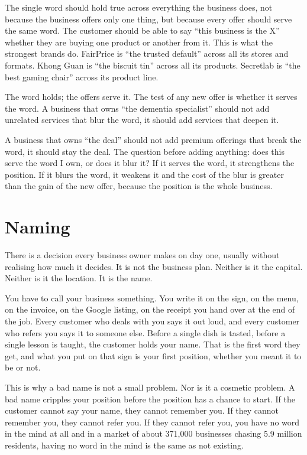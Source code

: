\documentclass[10pt,twoside,openany]{memoir}
\begin{document}
{The single word should hold true across everything the business does,
not because the business offers only one thing, but because every offer
should serve the same word. The customer should be able to say ``this
business is the X'' whether they are buying one product or another from
it. This is what the strongest brands do. FairPrice is ``the trusted
default'' across all its stores and formats. Khong Guan is ``the biscuit
tin'' across all its products. Secretlab is ``the best gaming chair''
across its product line.

The word holds; the offers serve it. The test of any new offer is
whether it serves the word. A business that owns ``the dementia
specialist'' should not add unrelated services that blur the word, it
should add services that deepen it.

A business that owns ``the deal'' should not add premium offerings that
break the word, it should stay the deal. The question before adding
anything: does this serve the word I own, or does it blur it? If it
serves the word, it strengthens the position. If it blurs the word, it
weakens it and the cost of the blur is greater than the gain of the new
offer, because the position is the whole business.

\FloatBarrier
\chapter{Naming}\label{naming}

There is a decision every business owner makes on day one, usually
without realising how much it decides. It is not the business plan.
Neither is it the capital. Neither is it the location. It is the name.

You have to call your business something. You write it on the sign, on
the menu, on the invoice, on the Google listing, on the receipt you hand
over at the end of the job. Every customer who deals with you says it
out loud, and every customer who refers you says it to someone else.
Before a single dish is tasted, before a single lesson is taught, the
customer holds your name. That is the first word they get, and what you
put on that sign is your first position, whether you meant it to be or
not.

This is why a bad name is not a small problem. Nor is it a cosmetic
problem. A bad name cripples your position before the position has a
chance to start. If the customer cannot say your name, they cannot
remember you. If they cannot remember you, they cannot refer you. If
they cannot refer you, you have no word in the mind at all and in a
market of about 371,000 businesses chasing 5.9 million residents, having
no word in the mind is the same as not existing.

}
\end{document}
